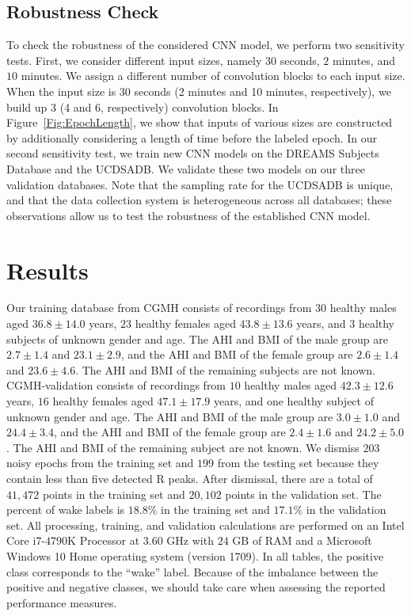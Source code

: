 \documentclass[10pt,a4paper,english]{amsart}
\begin{document}
\subsection{Robustness Check}


To check the robustness of the considered CNN model, we perform two sensitivity tests.  First, we consider different input sizes, namely $30$ seconds, $2$ minutes, and $10$ minutes. We assign a different number of convolution blocks to each input size. When the input size is 30 seconds (2 minutes and 10 minutes, respectively), we build up 3 (4 and 6, respectively) convolution blocks.  
%
In Figure~\ref{Fig:EpochLength}, we show that inputs of various sizes are constructed by additionally considering a length of time before the labeled epoch. 
%
In our second sensitivity test, we train new CNN models on the DREAMS Subjects Database and the UCDSADB. We validate these two models on our three validation databases. 
Note that the sampling rate for the UCDSADB is unique, and that the data collection system is heterogeneous across all databases; these observations allow us to test the robustness of the established CNN model.

\section{Results}\label{Section:Results}

Our training database from CGMH consists of recordings from $30$ healthy males aged $36.8 \pm 14.0$ years, $23$ healthy females aged $43.8 \pm 13.6$ years, and $3$ healthy subjects of unknown gender and age.  The AHI and BMI of the male group are $2.7 \pm 1.4$ and $23.1 \pm 2.9$, and the AHI and BMI of the female group are $2.6 \pm 1.4$ and $23.6 \pm 4.6$. The AHI and BMI of the remaining subjects are not known.  CGMH-validation consists of recordings from $10$ healthy males aged $42.3 \pm 12.6$ years, $16$ healthy females aged $47.1 \pm 17.9$ years, and one healthy subject of unknown gender and age.  The AHI and BMI of the male group are $3.0 \pm 1.0$ and $24.4 \pm 3.4$, and the AHI and BMI of the female group are $2.4 \pm 1.6$ and $24.2 \pm 5.0$. The AHI and BMI of the remaining subject are not known. We dismiss $203$ noisy epochs from the training set and $199$ from the testing set because they contain less than five detected R peaks. After dismissal, there are a total of $41,472$ points in the training set and $20,102$ points in the validation set. The percent of wake labels is $18.8\%$ in the training set and $17.1 \%$ in the validation set.
All processing, training, and validation calculations are performed on an Intel\textsuperscript{\textregistered} Core\texttrademark{} $\mathrm{i}7$-$4790\mathrm{K}$ Processor at $3.60$ $\mathrm{GHz}$ with $24$ $\mathrm{GB}$ of RAM and a Microsoft\textsuperscript{\textregistered} Windows\textsuperscript{\textregistered} 10 Home operating system (version 1709). 
In all tables, the positive class corresponds to the ``wake'' label. Because of the imbalance between the positive and negative classes, we should take care when assessing the reported performance measures.
\end{document}
